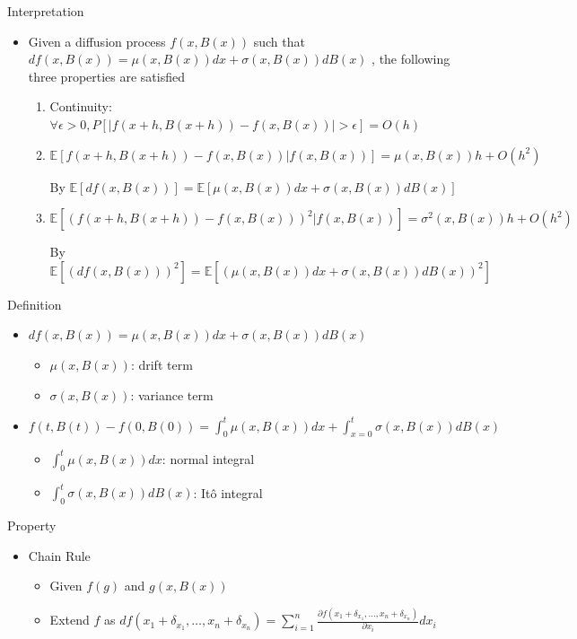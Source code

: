 \documentclass[a4paper]{article}
\begin{document}
\begin{itemize}
        Interpretation
        \begin{itemize}
            \item Given a diffusion process $f(x, B(x))$ such that $d f(x, B(x)) = \mu(x, B(x)) dx + \sigma(x, B(x)) d B(x)$ , the following three properties are satisfied
                \begin{enumerate}
                    \item Continuity: $\forall \epsilon > 0, P[|f(x+h, B(x+h)) - f(x, B(x))| > \epsilon] = O(h)$
                    \item $\mathbb{E}[f(x+h, B(x+h)) - f(x, B(x))| f(x, B(x))] = \mu(x, B(x)) h + O(h^2)$

                        By $\mathbb{E}[d f(x, B(x))] = \mathbb{E}[\mu(x, B(x)) dx + \sigma(x, B(x)) d B(x)]$
                    \item $\mathbb{E}[(f(x+h, B(x+h)) - f(x, B(x)))^2| f(x, B(x))] = \sigma^2(x, B(x)) h + O(h^2)$

                        By $\mathbb{E}[(d f(x, B(x)))^2] = \mathbb{E}[(\mu(x, B(x)) dx + \sigma(x, B(x)) d B(x))^2]$
                \end{enumerate}
        \end{itemize}
        Definition
        \begin{itemize}
            \item $d f(x, B(x)) = \mu(x, B(x)) dx + \sigma(x, B(x)) d B(x)$
                \begin{itemize}
                    \item $\mu(x, B(x))$: drift term
                    \item $\sigma(x, B(x))$: variance term
                \end{itemize}
            \item $f(t, B(t)) - f(0, B(0)) = \int_0^t \mu(x, B(x)) dx + \int_{x=0}^t \sigma(x, B(x)) d B(x)$
                \begin{itemize}
                    \item $\int_0^t \mu(x, B(x)) dx$: normal integral
                    \item $\int_0^t \sigma(x, B(x)) d B(x)$: It\^{o} integral
                \end{itemize}
        \end{itemize}
        Property
        \begin{itemize}
            \item Chain Rule
                \begin{itemize}
                    \item Given $f(g)$ and $g(x, B(x))$
                    \item Extend $f$ as $d f(x_1+ \delta_{x_1}, \dots, x_n + \delta_{x_n}) = \sum_{i=1}^n \frac{\partial f(x_1 + \delta_{x_1}, \dots, x_n + \delta_{x_n})}{\partial x_i} d x_i$


\end{itemize}
\end{itemize}
\end{itemize}
\end{document}
